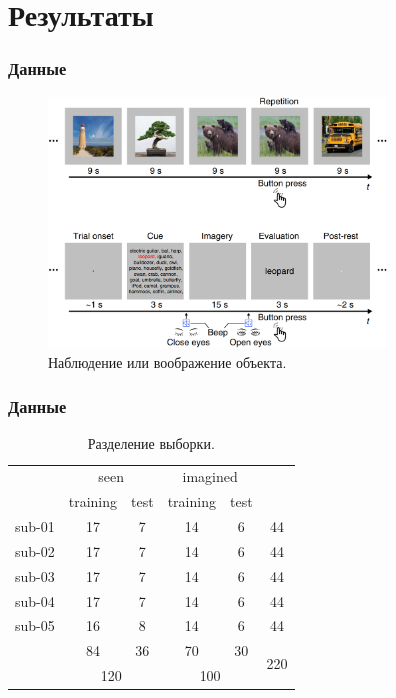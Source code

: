 \documentclass{beamer}
\begin{document}
	\section{Результаты}
	\begin{frame} 
		\frametitle{Данные}
		\begin{figure}
			\includegraphics[width=9cm]{../images/data_3.png}
			\caption{Наблюдение или воображение объекта.} 
			\label{fg:12}
		\end{figure}
	\end{frame}

	\begin{frame} 
		\frametitle{Данные}
		\vspace{0.5cm}
		
		\begin{table}[]
			\begin{tabular}{c|cc|cc|c}
				& \multicolumn{2}{c|}{seen}            & \multicolumn{2}{c|}{imagined}        &                      \\ \cline{2-5}
				& \multicolumn{1}{c|}{training} & test & \multicolumn{1}{c|}{training} & test &                      \\ \hline
				sub-01 & \multicolumn{1}{c|}{17}       & 7    & \multicolumn{1}{c|}{14}       & 6    & 44                   \\
				sub-02 & \multicolumn{1}{c|}{17}       & 7    & \multicolumn{1}{c|}{14}       & 6    & 44                   \\
				sub-03 & \multicolumn{1}{c|}{17}       & 7    & \multicolumn{1}{c|}{14}       & 6    & 44                   \\
				sub-04 & \multicolumn{1}{c|}{17}       & 7    & \multicolumn{1}{c|}{14}       & 6    & 44                   \\
				sub-05 & \multicolumn{1}{c|}{16}       & 8    & \multicolumn{1}{c|}{14}       & 6    & 44                   \\ \hline
				& \multicolumn{1}{c|}{84}       & 36   & \multicolumn{1}{c|}{70}       & 30   & \multirow{2}{*}{220} \\ \cline{2-5}
				& \multicolumn{2}{c|}{120}             & \multicolumn{2}{c|}{100}             &                     
			\end{tabular}
			
			\caption{Разделение выборки.} 
		\end{table}
	\end{frame}
\end{document}
